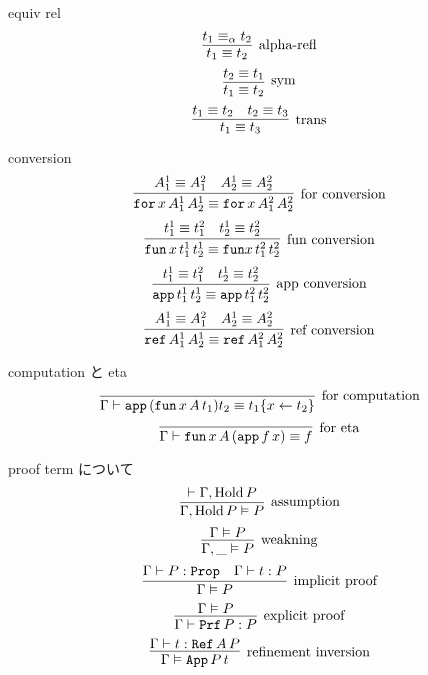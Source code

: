 \begin{itembox}[l]{equiv rel}
  \[\infer[\text{alpha-refl}]{t_1 \equiv t_2}{t_1 \equiv_{\alpha} t_2}\]
  \[\infer[\text{sym}]{t_1 \equiv t_2}{t_2 \equiv t_1}\]
  \[\infer[\text{trans}]{t_1 \equiv t_3}{t_1 \equiv t_2 & t_2 \equiv t_3}\]
\end{itembox}

\begin{itembox}[l]{conversion}
  \[\infer[\text{for conversion}]{\texttt{for} \, x \, A^1_1 \, A^1_2 \equiv \texttt{for} \, x \, A^2_1 \, A^2_2}{A^1_1 \equiv A^2_1 & A^1_2 \equiv A^2_2}\]
  \[\infer[\text{fun conversion}]{\texttt{fun} \, x \, t^1_1 \, t^1_2 \equiv \texttt{fun} x \, t^2_1 \, t^2_2}{t^1_1 \equiv t^2_1 & t^1_2 \equiv t^2_2}\]
  \[\infer[\text{app conversion}]{\texttt{app} \, t^1_1 \, t^1_2 \equiv \texttt{app} \, t^2_1 \, t^2_2}{t^1_1 \equiv t^2_1 & t^1_2 \equiv t^2_2}\]
  \[\infer[\text{ref conversion}]{\texttt{ref} \, A^1_1 \, A^1_2 \equiv \texttt{ref} \, A^2_1 \, A^2_2}{A^1_1 \equiv A^2_1 & A^1_2 \equiv A^2_2}\]
\end{itembox}

\begin{itembox}[l]{computation と eta}
  \[\infer[\text{for computation}]{\Gamma \vdash \texttt{app} \, (\texttt{fun} \, x \, A \, t_1) t_2 \equiv t_1\{x \leftarrow t_2\} }{}\]
  \[\infer[\text{for eta}]{\Gamma \vdash \texttt{fun} \, x \, A \, (\texttt{app} \, f \, x) \equiv f}{}\]
\end{itembox}

\begin{itembox}[l]{proof term について}
  \[\infer[\text{assumption}]{\Gamma , \text{Hold} \, P \vDash P}{\vdash \Gamma , \text{Hold} \, P}\]
  \[\infer[\text{weakning}]{\Gamma , \_ \vDash P}{\Gamma \vDash P}\]
  \[\infer[\text{implicit proof}]{\Gamma \vDash P}{\Gamma \vdash P : \texttt{Prop} & \Gamma \vdash t : P} \]
  \[\infer[\text{explicit proof}]{\Gamma \vdash \texttt{Prf} \, P : P}{\Gamma \vDash P} \]
  \[\infer[\text{refinement inversion}]{\Gamma \vDash \texttt{App} \, P \, t}{\Gamma \vdash t : \texttt{Ref} \, A \, P}\]
\end{itembox}